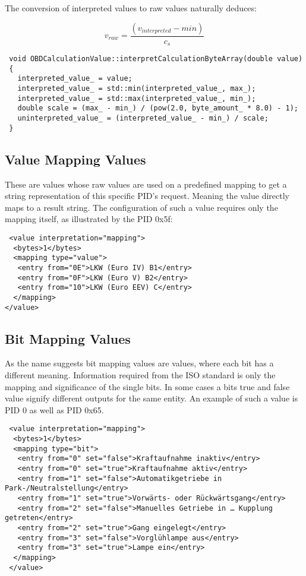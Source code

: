 The conversion of interpreted values to raw values  naturally deduces:

\[ v_{raw} = \frac{(v_{interpreted} - min)}{c_s} \]

\begin{lstlisting}
 void OBDCalculationValue::interpretCalculationByteArray(double value)
 {
   interpreted_value_ = value;
   interpreted_value_ = std::min(interpreted_value_, max_);
   interpreted_value_ = std::max(interpreted_value_, min_);
   double scale = (max_ - min_) / (pow(2.0, byte_amount_ * 8.0) - 1);
   uninterpreted_value_ = (interpreted_value_ - min_) / scale;
 }
\end{lstlisting}

\subsection{Value Mapping Values}

These are values whose raw values are used on a predefined mapping to get a string representation of this specific PID’s request. Meaning the 
value directly maps to a result string. The configuration of such a value requires only the mapping itself, as illustrated by the PID 0x5f:

\begin{lstlisting}
 <value interpretation="mapping">
  <bytes>1</bytes>
  <mapping type="value">
   <entry from="0E">LKW (Euro IV) B1</entry>
   <entry from="0F">LKW (Euro V) B2</entry>
   <entry from="10">LKW (Euro EEV) C</entry>
  </mapping>        
</value>
\end{lstlisting}

\subsection{Bit Mapping Values}

As the name suggests bit mapping values are values, where each bit has a different meaning. Information required from the ISO standard is only
the mapping and significance of the single bits. In some cases a bits true and false value signify different outputs for the same entity. An 
example of such a value is PID 0 as well as PID 0x65.

\begin{lstlisting}
 <value interpretation="mapping">
  <bytes>1</bytes>
  <mapping type="bit">
   <entry from="0" set="false">Kraftaufnahme inaktiv</entry>
   <entry from="0" set="true">Kraftaufnahme aktiv</entry>
   <entry from="1" set="false">Automatikgetriebe in Park-/Neutralstellung</entry>
   <entry from="1" set="true">Vorwärts- oder Rückwärtsgang</entry>
   <entry from="2" set="false">Manuelles Getriebe in … Kupplung getreten</entry>
   <entry from="2" set="true">Gang eingelegt</entry>
   <entry from="3" set="false">Vorglühlampe aus</entry>
   <entry from="3" set="true">Lampe ein</entry>
  </mapping>
 </value>
\end{lstlisting}

